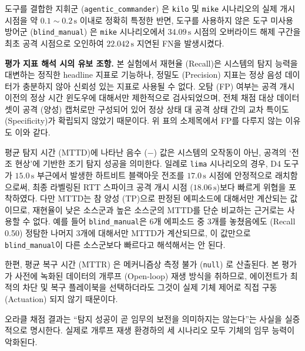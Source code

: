 도구를 결합한 지휘군 (\texttt{agentic\_commander}) 은 \texttt{kilo} 및 \texttt{mike} 시나리오의 실제 개시 시점을 약 $0.1\sim0.2\,\text{s}$ 이내로 정확히 특정한 반면, 도구를 사용하지 않은 도구 미사용 방어군 (\texttt{blind\_manual}) 은 \texttt{mike} 시나리오에서 $34.09\,\text{s}$ 시점의 오버라이드 해제 구간을 최초 공격 시점으로 오인하여 $22.042\,\text{s}$ 지연된 FN을 발생시켰다.

\noindent \textbf{평가 지표 해석 시의 유보 조항.} 본 실험에서 재현율 (Recall)은 시스템의 탐지 능력을 대변하는 정직한 headline 지표로 기능하나, 정밀도 (Precision) 지표는 정상 음성 데이터가 충분하지 않아 신뢰성 있는 지표로 사용될 수 없다. 오탐 (FP) 여부는 공격 개시 이전의 정상 시간 윈도우에 대해서만 제한적으로 검사되었으며, 전체 채점 대상 데이터셋이 공격 (양성) 캡처로만 구성되어 있어 정상 상태 대 공격 상태 간의 교차 특이도 (Specificity)가 확립되지 않았기 때문이다. 위 표의 소제목에서 FP를 다루지 않는 이유도 이와 같다.

평균 탐지 시간 (MTTD)에 나타난 음수 ($-$) 값은 시스템의 오작동이 아닌, 공격의 `전조 현상'에 기반한 조기 탐지 성공을 의미한다. 일례로 \texttt{lima} 시나리오의 경우, D4 도구가 $15.0\,\text{s}$ 부근에서 발생한 하트비트 블랙아웃 전조를 $17.0\,\text{s}$ 시점에 안정적으로 래치함으로써, 최종 라벨링된 RTT 스파이크 공격 개시 시점 ($18.06\,\text{s}$)보다 빠르게 위협을 포착하였다. 다만 MTTD는 참 양성 (TP)으로 판정된 에피소드에 대해서만 계산되는 값이므로, 재현율이 낮은 소스군과 높은 소스군의 MTTD를 단순 비교하는 근거로는 사용할 수 없다. 예를 들어 \texttt{blind\_manual}은 6개 에피소드 중 3개를 놓쳤음에도 (Recall 0.50) 정탐한 나머지 3개에 대해서만 MTTD가 계산되므로, 이 값만으로 \texttt{blind\_manual}이 다른 소스군보다 빠르다고 해석해서는 안 된다.

한편, 평균 복구 시간 (MTTR) 은 메커니즘상 측정 불가 (\texttt{null}) 로 산출된다. 본 평가가 사전에 녹화된 데이터의 개루프 (Open-loop) 재생 방식을 취하므로, 에이전트가 최적의 차단 및 복구 플레이북을 선택하더라도 그것이 실제 기체 제어로 직접 구동 (Actuation) 되지 않기 때문이다. 

오라클 채점 결과는 ``탐지 성공이 곧 임무의 보전을 의미하지는 않는다''는 사실을 실증적으로 명시한다. 실제로 개루프 재생 환경하의 세 시나리오 모두 기체의 임무 능력이 악화된다.


